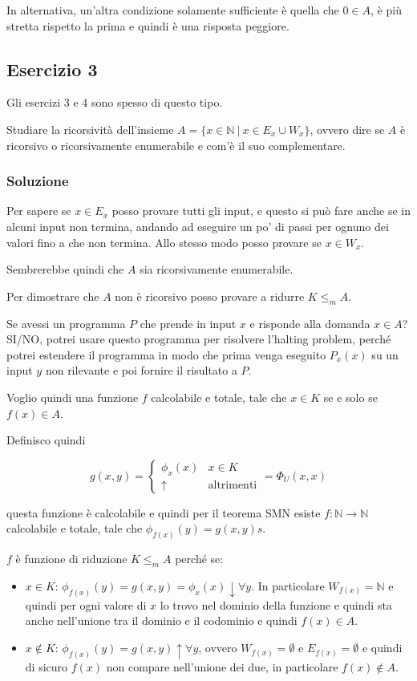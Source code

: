 In alternativa, un'altra condizione solamente sufficiente è quella che $0 \in A$, è più stretta rispetto la prima e quindi è una risposta peggiore.

\subsection{Esercizio 3}

Gli esercizi 3 e 4 sono spesso di questo tipo.

Studiare la ricorsività dell'insieme $A = \{ x \in \mathbb{N} \: | \: x \in E_x \cup W_x \}$, ovvero dire se $A$ è ricorsivo o ricorsivamente enumerabile e com'è il suo complementare.

\subsubsection{Soluzione}

Per sapere se $x \in E_x$ posso provare tutti gli input, e questo si può fare anche se in alcuni input non termina, andando ad eseguire un po' di passi per ognuno dei valori fino a che non termina.
Allo stesso modo posso provare se $x \in W_x$.

Sembrerebbe quindi che $A$ sia ricorsivamente enumerabile.

Per dimostrare che $A$ non è ricorsivo posso provare a ridurre $K \leq_m A$.

Se avessi un programma $P$ che prende in input $x$ e risponde alla domanda $x \in A$? SI/NO, potrei usare questo programma per risolvere l'halting problem, perché potrei estendere il programma in modo che prima venga eseguito $P_x(x)$ su un input $y$ non rilevante e poi fornire il risultato a $P$.

Voglio quindi una funzione $f$ calcolabile e totale, tale che $x \in K$ se e solo se $f(x) \in A$.

Definisco quindi 

$$
g(x, y) = \begin{cases}
\phi_x(x) & x \in K \\
\uparrow &\text{altrimenti}
\end{cases} = \Phi_U(x,x)
$$

questa funzione è calcolabile e quindi per il teorema SMN esiste $f : \mathbb{N} \rightarrow \mathbb{N}$ calcolabile e totale, tale che $\phi_{f(x)}(y) = g(x,y)s$.

$f$ è funzione di riduzione $K \leq_m A$ perché se:

\begin{itemize}
	\item $x \in K$: $\phi_{f(x)}(y) = g(x,y) = \phi_x(x) \downarrow \forall y$. In particolare $W_{f(x)} = \mathbb{N}$ e quindi per ogni valore di $x$ lo trovo nel dominio della funzione e quindi sta anche nell'unione tra il dominio e il codominio e quindi $f(x) \in A$.
	\item $x \notin K$: $\phi_{f(x)}(y) = g(x,y) \uparrow \forall y$, ovvero $W_{f(x)} = \emptyset$ e $E_{f(x)} = \emptyset$ e quindi di sicuro $f(x)$ non compare nell'unione dei due, in particolare $f(x) \notin A$.
\end{itemize}

